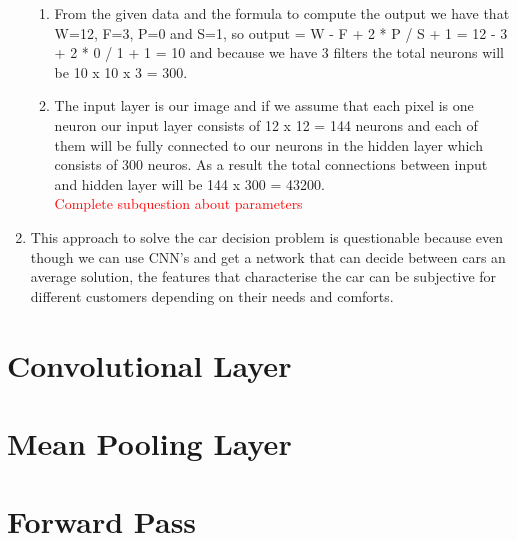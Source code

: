 \documentclass{article}
\begin{document}
\begin{enumerate}
\begin{enumerate}
\item From the given data and the formula to compute the output we have that W=12, F=3, P=0 and S=1, so output = W - F + 2 * P / S + 1 = 12 - 3 + 2 * 0 / 1 + 1 =  10 and because we have 3 filters the total neurons will be 10 x 10 x 3 = 300.\\
\item
 The input layer is our image and if we assume that  each pixel is one neuron our input layer consists of 12 x 12 = 144 neurons and each of them will be fully connected to our neurons in the hidden layer which consists of 300 neuros. As a result the total connections between input and hidden layer will be 144 x 300 = 43200.\\
\textcolor{red}{Complete subquestion about parameters}
\end{enumerate}
\item This approach to solve the car decision problem is questionable because even though we can use CNN's and get a network that can decide between cars an average solution, the features that characterise the car can be subjective for different customers depending on their needs and comforts.
\end{enumerate}
\setcounter{section}{+3}
\section{Convolutional Layer}

\section{Mean Pooling Layer}

\section{Forward Pass}

\end{document}
